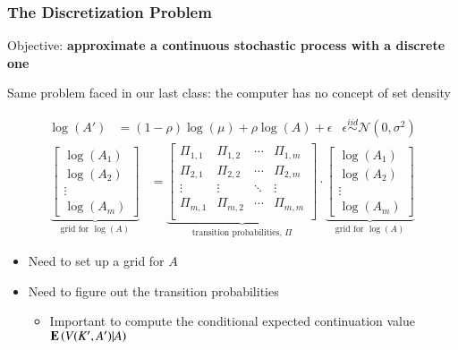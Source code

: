 \documentclass[10pt, aspectratio=1610, handout]{beamer}
\begin{document}
  \begin{frame}
    \frametitle{The Discretization Problem}

    Objective: \textbf{approximate a continuous stochastic process with a discrete one}

    \vfill\pause

    Same problem faced in our last class: the computer has no concept of set density

    \vfill\pause

    \begin{align*}
      \log(A') &= (1 - \rho) \log(\mu) + \rho \log(A) + \epsilon & \epsilon \overset{iid}{\sim} \mathcal{N}(0, \sigma^2)
    \end{align*}
    \begin{align*}
      \underbrace{\begin{bmatrix}
        \log(A_1) \\ \log(A_2) \\ \vdots \\ \log(A_m)
      \end{bmatrix}}_{\text{grid for $\log(A)$}}
      &=
      \underbrace{\begin{bmatrix}
        \Pi_{1,1} & \Pi_{1,2} & \cdots & \Pi_{1,m} \\
        \Pi_{2,1} & \Pi_{2,2} & \cdots & \Pi_{2,m} \\
        \vdots    & \vdots    & \ddots & \vdots    \\
        \Pi_{m,1} & \Pi_{m,2} & \cdots & \Pi_{m,m} \\
      \end{bmatrix}}_{\text{transition probabilities, $\Pi$}}
      \cdot
      \underbrace{\begin{bmatrix}
        \log(A_1) \\ \log(A_2) \\ \vdots \\ \log(A_m)
      \end{bmatrix}}_{\text{grid for $\log(A)$}}
    \end{align*}

    \vfill\pause

    \begin{itemize}
      \item Need to set up a grid for $A$ 
      \item Need to figure out the transition probabilities 
        \begin{itemize}
          \item Important to compute the conditional expected continuation value $\mathbf{E} \left( V(K', A') | A \right)$
        \end{itemize}
    \end{itemize}

  \end{frame}
\end{document}
